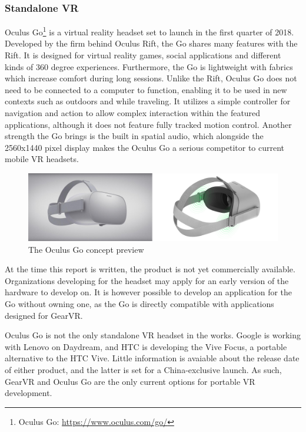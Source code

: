 		
		\subsubsection{Standalone VR}
		Oculus Go\footnote{Oculus Go: \url{https://www.oculus.com/go/}} is a virtual reality headset set to launch in the first quarter of 2018. Developed by the firm behind Oculus Rift, the Go shares many features with the Rift. It is designed for virtual reality games, social applications and different kinds of 360 degree experiences. Furthermore, the Go is lightweight with fabrics which increase comfort during long sessions. Unlike the Rift, Oculus Go does not need to be connected to a computer to function, enabling it to be used in new contexts such as outdoors and while traveling. It utilizes a simple controller for navigation and action to allow complex interaction within the featured applications, although it does not feature fully tracked motion control. Another strength the Go brings is the built in spatial audio, which alongside the 2560x1440 pixel display makes the Oculus Go a serious competitor to current mobile VR headsets.   \\
		\begin{figure}[H]
			\centering
			\includegraphics[width=1.0\linewidth]{figure/Analysis/oculusgo}
			\caption{The Oculus Go concept preview}
			\label{fig:Oculus}
		\end{figure}
		
		At the time this report is written, the product is not yet commercially available. Organizations developing for the headset may apply for an early version of the hardware to develop on. It is however possible to develop an application for the Go without owning one, as the Go is directly compatible with applications designed for GearVR. 
		
		Oculus Go is not the only standalone VR headset in the works. Google is working with Lenovo on Daydream, and HTC is developing the Vive Focus, a portable alternative to the HTC Vive. Little information is avaiable about the release date of either product, and the latter is set for a China-exclusive launch. As such, GearVR and Oculus Go are the only current options for portable VR development. 
		
